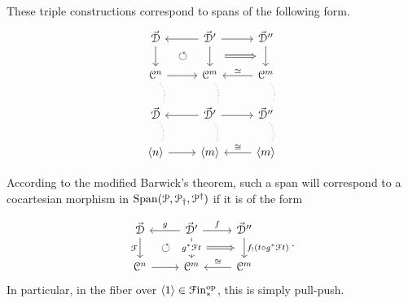 \documentclass[main.tex]{subfiles}
\begin{document}
These triple constructions correspond to spans of the following form.
\begin{equation*}
  \begin{tikzcd}
    \vec{\category{D}}
    \arrow[d, ""{name=L, right}]
    & \vec{\category{D}}'
    \arrow[d, ""{name=ML, left}, ""{name=MR, right}]
    \arrow[r]
    \arrow[l]
    & \vec{\category{D}}''
    \arrow[d, ""{name=R, right}]
    \\
    \category{C}^{n}
    \arrow[d, no head, dotted, bend left]
    \arrow[r]
    & \category{C}^{m}
    \arrow[d, no head, dotted, bend left]
    & \category{C}^{m}
    \arrow[l, swap, "\simeq"]
    \arrow[d, no head, dotted, bend left]
    \\
    \vec{\category{D}}
    \arrow[d, no head, dotted, bend left]
    & \vec{\category{D}}'
    \arrow[d, no head, dotted, bend left]
    \arrow[r]
    \arrow[l]
    & \vec{\category{D}}''
    \arrow[d, no head, dotted, bend left]
    \\
    \langle n \rangle
    \arrow[r]
    & \langle m \rangle
    & \langle m \rangle
    \arrow[l, swap, "\cong"]
    \arrow[from=ML, to=L, phantom, shorten=1.5ex, "\circlearrowleft"{description}]
    \arrow[from=MR, to=R, Rightarrow, shorten=2ex]
  \end{tikzcd}
\end{equation*}

According to the modified Barwick's theorem, such a span will correspond to a cocartesian morphism in $\mathrm{Span}(\mathcal{P}, \mathcal{P}_{\dagger}, \mathcal{P}^{\dagger})$ if it is of the form

\begin{equation*}
  \begin{tikzcd}
    \vec{\category{D}}
    \arrow[d, "\mathcal{F}"{left}, ""{name=L, right}]
    & \vec{\category{D}}'
    \arrow[d, "g^{*}\mathcal{F}t"{description}, ""{name=ML, left}, ""{name=MR, right}]
    \arrow[r, "f"]
    \arrow[l, swap, "g"]
    & \vec{\category{D}}''
    \arrow[d, ""{name=R, right}, "f_{!}(t \circ g^{*}\mathcal{F}t)"]
    \\
    \category{C}^{n}
    \arrow[r]
    & \category{C}^{m}
    & \category{C}^{m}
    \arrow[l, swap, "\cong"]
    \arrow[from=ML, to=L, phantom, shorten=1.5ex, "\circlearrowleft"{description}]
    \arrow[from=MR, to=R, Rightarrow, shorten=2ex]
  \end{tikzcd}.
\end{equation*}
In particular, in the fiber over $\langle 1 \rangle \in \mathcal{F}\mathrm{in}_{*}^{\mathrm{op}}$, this is simply pull-push.
\end{document}
